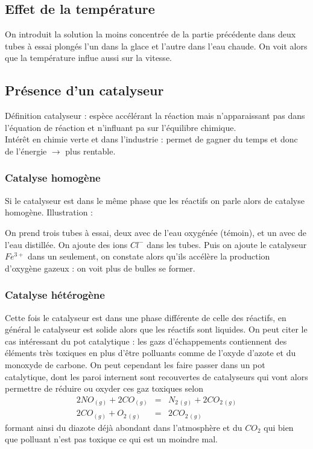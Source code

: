 \documentclass[12pt,prb,aps,epsf]{article}
\begin{document}
\subsection{Effet de la température}
On introduit la solution la moins concentrée de la partie précédente dans deux tubes à essai plongés l'un dans la glace et l'autre dans l'eau chaude. On voit alors que la température influe aussi sur la vitesse.

\subsection{Présence d'un catalyseur}
Définition catalyseur : espèce accélérant la réaction mais n'apparaissant pas dans l'équation de réaction et n'influant pa sur l'équilibre chimique.\\
Intérêt en chimie verte et dans l'industrie : permet de gagner du temps et donc de l'énergie $\rightarrow$ plus rentable.

\subsubsection{Catalyse homogène}
Si le catalyseur est dans le même phase que les réactifs on parle alors de catalyse homogène. Illustration :

On prend trois tubes à essai, deux avec de l'eau oxygénée (témoin), et un avec de l'eau distillée. On ajoute des ions $Cl^-$ dans les tubes. Puis on ajoute le catalyseur $Fe^{3+}$ dans un seulement, on constate alors qu'ils accélère la production d'oxygène gazeux : on voit plus de bulles se former.

\subsubsection{Catalyse hétérogène}
Cette fois le catalyseur est dans une phase différente de celle des réactifs, en général le catalyseur est solide alors que les réactifs sont liquides. On peut citer le cas intéressant du pot catalytique : les gazs d'échappements contiennent des éléments très toxiques en plus d'être polluants comme de l'oxyde d'azote et du monoxyde de carbone. On peut cependant les faire passer dans un pot catalytique, dont les paroi internent sont recouvertes de catalyseurs qui vont alors permettre de réduire ou oxyder ces gaz toxiques selon 
\begin{eqnarray}
2NO_{(g)} + 2CO_{(g)} &=& N_{2\,(g)} + 2CO_{2\,(g)}\\
2CO_{(g)} + O_{2\,(g)} &=& 2CO_{2\,(g)}
\end{eqnarray}
formant ainsi du diazote déjà abondant dans l'atmosphère et du $CO_2$ qui bien que polluant n'est pas toxique ce qui est un moindre mal.\\
\end{document}

